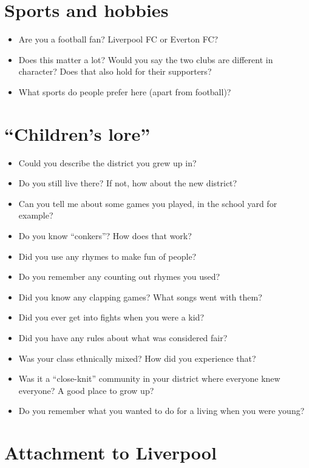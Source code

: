 {	
	  
	\section*{Sports and hobbies}
	
		\begin{itemize}
			\item Are you a football fan? Liverpool FC or Everton FC?
			\item Does this matter a lot? Would you say the two clubs are different in character? Does that also hold for their supporters?
			\item What sports do people prefer here (apart from football)?
		\end{itemize}
	
	
	\section*{``Children’s lore''}
	
		\begin{itemize}
			\item Could you describe the district you grew up in?
			\item Do you still live there? If not, how about the new district?
			\item Can you tell me about some games you played, in the school yard for example?
			\item Do you know ``conkers''? How does that work?
			\item Did you use any rhymes to make fun of people?
			\item Do you remember any counting out rhymes you used?
			\item Did you know any clapping games? What songs went with them?
			\item Did you ever get into fights when you were a kid?
			\item Did you have any rules about what was considered fair?
			\item Was your class ethnically mixed? How did you experience that?
			\item Was it a ``close-knit'' community in your district where everyone knew everyone? A good place to grow up?
			\item Do you remember what you wanted to do for a living when you were young?
		\end{itemize}
	
	
	\section*{Attachment to Liverpool}
	
}

